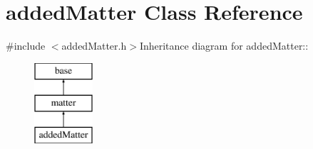\hypertarget{classadded_matter}{
\section{addedMatter Class Reference}
\label{classadded_matter}
}


{\ttfamily \#include $<$addedMatter.h$>$}Inheritance diagram for addedMatter::\begin{figure}[H]
\begin{center}
\leavevmode
\includegraphics[height=3cm]{classadded_matter}
\end{center}
\end{figure}
